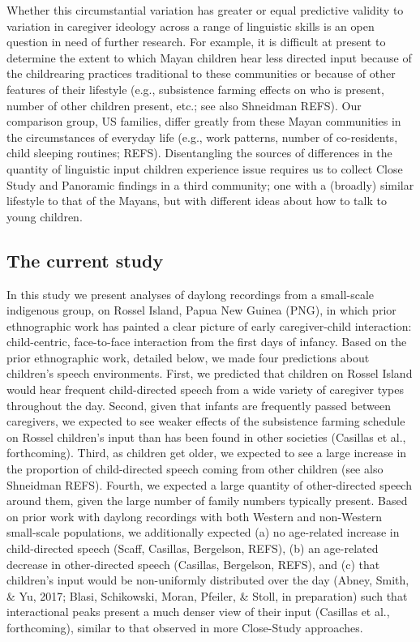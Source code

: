 \documentclass[,man,floatsintext]{apa6}
\begin{document}
Whether this circumstantial variation has greater or equal predictive
validity to variation in caregiver ideology across a range of linguistic
skills is an open question in need of further research. For example, it
is difficult at present to determine the extent to which Mayan children
hear less directed input because of the childrearing practices
traditional to these communities or because of other features of their
lifestyle (e.g., subsistence farming effects on who is present, number
of other children present, etc.; see also Shneidman REFS). Our
comparison group, US families, differ greatly from these Mayan
communities in the circumstances of everyday life (e.g., work patterns,
number of co-residents, child sleeping routines; REFS). Disentangling
the sources of differences in the quantity of linguistic input children
experience issue requires us to collect Close Study and Panoramic
findings in a third community; one with a (broadly) similar lifestyle to
that of the Mayans, but with different ideas about how to talk to young
children.

\subsection{The current study}\label{the-current-study}

In this study we present analyses of daylong recordings from a
small-scale indigenous group, on Rossel Island, Papua New Guinea (PNG),
in which prior ethnographic work has painted a clear picture of early
caregiver-child interaction: child-centric, face-to-face interaction
from the first days of infancy. Based on the prior ethnographic work,
detailed below, we made four predictions about children's speech
environments. First, we predicted that children on Rossel Island would
hear frequent child-directed speech from a wide variety of caregiver
types throughout the day. Second, given that infants are frequently
passed between caregivers, we expected to see weaker effects of the
subsistence farming schedule on Rossel children's input than has been
found in other societies (Casillas et al., forthcoming). Third, as
children get older, we expected to see a large increase in the
proportion of child-directed speech coming from other children (see also
Shneidman REFS). Fourth, we expected a large quantity of other-directed
speech around them, given the large number of family numbers typically
present. Based on prior work with daylong recordings with both Western
and non-Western small-scale populations, we additionally expected (a) no
age-related increase in child-directed speech (Scaff, Casillas,
Bergelson, REFS), (b) an age-related decrease in other-directed speech
(Casillas, Bergelson, REFS), and (c) that children's input would be
non-uniformly distributed over the day (Abney, Smith, \& Yu, 2017;
Blasi, Schikowski, Moran, Pfeiler, \& Stoll, in preparation) such that
interactional peaks present a much denser view of their input (Casillas
et al., forthcoming), similar to that observed in more Close-Study
approaches.
\end{document}
